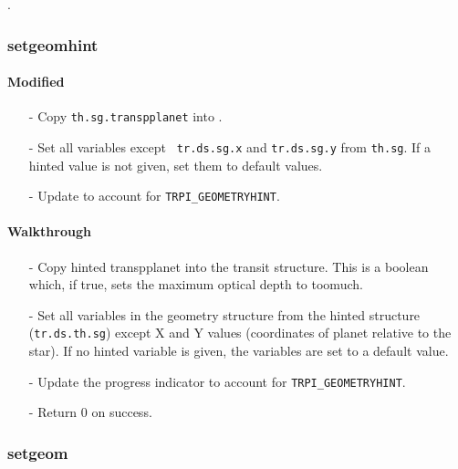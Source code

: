 \documentclass[letterpaper,12pt]{article}
\begin{document}
. \newline

 \newline

\subsubsection{setgeomhint}
\paragraph{Modified}
\begin{enumerate}[leftmargin=10pt, noitemsep, parsep=0pt, topsep=0ex]
\item[-] Copy {\tt th.sg.transpplanet} into .
\item[-] Set all  variables except {\tt
    tr.ds.sg.x} and {\tt tr.ds.sg.y} from {\tt th.sg}. If a hinted value is not given, set them to default values.
\item[-] Update  to account for {\tt TRPI\_GEOMETRYHINT}.
\end{enumerate}

\paragraph{Walkthrough}
\begin{enumerate}[leftmargin=10pt, noitemsep, parsep=0pt, topsep=0ex]
\item[-] Copy hinted transpplanet into the transit structure. This is a boolean which, if true, sets the maximum optical depth to toomuch.
\item[-] Set all variables in the geometry structure from the hinted structure ({\tt tr.ds.th.sg}) except X and Y values (coordinates of planet relative to the star). If no hinted variable is given, the variables are set to a default value.
\item[-] Update the progress indicator to account for {\tt TRPI\_GEOMETRYHINT}.
\item[-] Return 0 on success.
\end{enumerate}

\subsubsection{setgeom}
\end{document}
